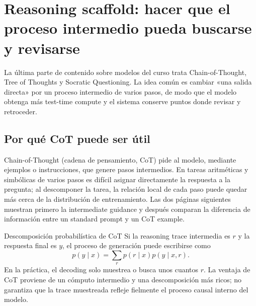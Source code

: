 \section{Reasoning scaffold: hacer que el proceso intermedio pueda buscarse y revisarse}

La última parte de contenido sobre modelos del curso trata Chain-of-Thought, Tree of Thoughts y Socratic Questioning. La idea común es cambiar «una salida directa» por un proceso intermedio de varios pasos, de modo que el modelo obtenga más test-time compute y el sistema conserve puntos donde revisar y retroceder.

\subsection{Por qué CoT puede ser útil}

Chain-of-Thought (cadena de pensamiento, CoT) pide al modelo, mediante ejemplos o instrucciones, que genere pasos intermedios. En tareas aritméticas y simbólicas de varios pasos es difícil asignar directamente la respuesta a la pregunta; al descomponer la tarea, la relación local de cada paso puede quedar más cerca de la distribución de entrenamiento. Las dos páginas siguientes muestran primero la intermediate guidance y después comparan la diferencia de información entre un standard prompt y un CoT example.



\begin{importantbox}{Descomposición probabilística de CoT}
Si la reasoning trace intermedia es $r$ y la respuesta final es $y$, el proceso de generación puede escribirse como
\[
p(y\mid x)=\sum_r p(r\mid x)p(y\mid x,r).
\]
En la práctica, el decoding solo muestrea o busca unos cuantos $r$. La ventaja de CoT proviene de un cómputo intermedio y una descomposición más ricos; no garantiza que la trace muestreada refleje fielmente el proceso causal interno del modelo.
\end{importantbox}



